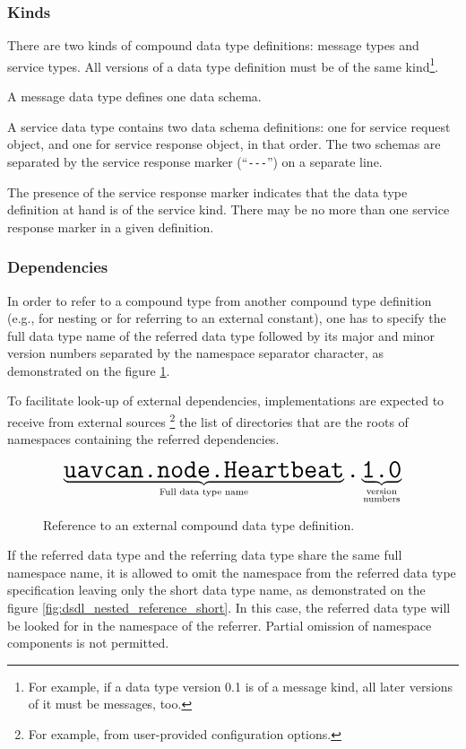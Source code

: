 \subsubsection{Kinds}

There are two kinds of compound data type definitions: message types and service types.
All versions of a data type definition must be of the same kind\footnote{%
For example, if a data type version 0.1 is of a message kind, all later versions of it must be messages, too.}.

A message data type defines one data schema.

A service data type contains two data schema definitions:
one for service request object, and one for service response object, in that order.
The two schemas are separated by the service response marker (``\verb|---|'') on a separate line.

The presence of the service response marker indicates that the data type definition at hand is of the service kind.
There may be no more than one service response marker in a given definition.

\subsubsection{Dependencies}

In order to refer to a compound type from another compound type definition
(e.g., for nesting or for referring to an external constant),
one has to specify the full data type name of the referred data type followed by its
major and minor version numbers separated by the namespace separator character,
as demonstrated on the figure \ref{fig:dsdl_nested_reference}.

To facilitate look-up of external dependencies,
implementations are expected to receive from external sources%
\footnote{For example, from user-provided configuration options.}
the list of directories that are the roots of namespaces containing the referred dependencies.

\begin{figure}[H]
    $$
    \underbrace{\texttt{\huge{uavcan.node.Heartbeat}}}_{\text{Full data type name}}%
    \texttt{\huge{.}}%
    \underbrace{\texttt{\huge{1.0}}}_{\substack{\text{version} \\ \text{numbers}}}%
    $$
    \caption{Reference to an external compound data type definition.\label{fig:dsdl_nested_reference}}
\end{figure}

If the referred data type and the referring data type share the same full namespace name,
it is allowed to omit the namespace from the referred data type specification
leaving only the short data type name, as demonstrated on the figure \ref{fig:dsdl_nested_reference_short}.
In this case, the referred data type will be looked for in the namespace of the referrer.
Partial omission of namespace components is not permitted.

